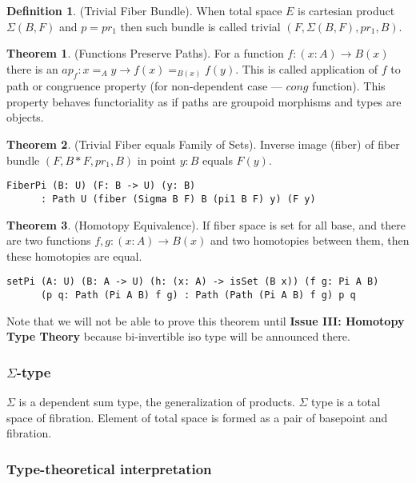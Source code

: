\documentclass[twoside]{article}
\theoremstyle{definition}
\newtheorem{theorem}{Theorem}
\newtheorem{definition}{Definition}
\begin{document}
\begin{definition} (Trivial Fiber Bundle).
When total space $E$ is cartesian product $\Sigma(B,F)$ and $p = pr_1$
then such bundle is called trivial $(F,\Sigma(B,F),pr_1,B)$.
\end{definition}

\begin{theorem} (Functions Preserve Paths).
For a function $f: (x:A) \rightarrow B(x)$
there is an $ap_f : x =_A y \rightarrow f(x) =_{B(x)} f(y)$. This is called
application of $f$ to path or congruence property (for non-dependent case ---
$cong$ function). This property behaves functoriality
as if paths are groupoid morphisms and types are objects.
\end{theorem}

\begin{theorem} (Trivial Fiber equals Family of Sets).
Inverse image (fiber) of fiber bundle $(F,B*F,pr_1,B)$ in point $y:B$ equals $F(y)$.
\begin{lstlisting}
FiberPi (B: U) (F: B -> U) (y: B)
      : Path U (fiber (Sigma B F) B (pi1 B F) y) (F y)
\end{lstlisting}
\end{theorem}

\begin{theorem} (Homotopy Equivalence).
If fiber space is set for all base, and
there are two functions $f,g : (x:A) \rightarrow B(x)$ and two
homotopies between them, then these homotopies are equal.
\begin{lstlisting}
setPi (A: U) (B: A -> U) (h: (x: A) -> isSet (B x)) (f g: Pi A B)
      (p q: Path (Pi A B) f g) : Path (Path (Pi A B) f g) p q
\end{lstlisting}
\end{theorem}

Note that we will not be able to prove this theorem
until {\bf Issue III: Homotopy Type Theory} because
bi-invertible iso type will be announced there.

\subsubsection{$\Sigma$-type}

$\Sigma$ is a dependent sum type, the generalization of products.
$\Sigma$ type is a total space of fibration. Element of total
space is formed as a pair of basepoint and fibration.

\subsubsection*{Type-theoretical interpretation}
\end{document}
